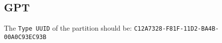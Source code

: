 \subsection{GPT}

The \texttt{Type UUID} of the partition should be: \texttt{C12A7328-\allowbreak{}F81F-\allowbreak11D2-\allowbreak{}BA4B-\allowbreak00A0C93EC93B}
